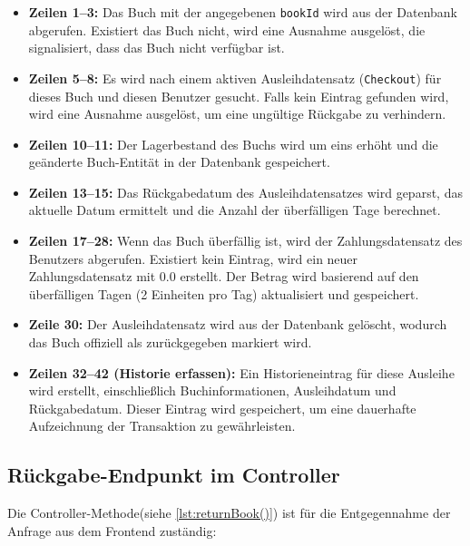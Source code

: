 \begin{itemize}
	\item \textbf{Zeilen 1--3:}  
	Das Buch mit der angegebenen \texttt{bookId} wird aus der Datenbank abgerufen. Existiert das Buch nicht, wird eine Ausnahme ausgelöst, die signalisiert, dass das Buch nicht verfügbar ist.
	
	\item \textbf{Zeilen 5--8:}  
	Es wird nach einem aktiven Ausleihdatensatz (\texttt{Checkout}) für dieses Buch und diesen Benutzer gesucht. Falls kein Eintrag gefunden wird, wird eine Ausnahme ausgelöst, um eine ungültige Rückgabe zu verhindern.
	
	\item \textbf{Zeilen 10--11:}  
	Der Lagerbestand des Buchs wird um eins erhöht und die geänderte Buch-Entität in der Datenbank gespeichert.
	
	\item \textbf{Zeilen 13--15:}  
	Das Rückgabedatum des Ausleihdatensatzes wird geparst, das aktuelle Datum ermittelt und die Anzahl der überfälligen Tage berechnet.
	
	\item \textbf{Zeilen 17--28:}  
	Wenn das Buch überfällig ist, wird der Zahlungsdatensatz des Benutzers abgerufen. Existiert kein Eintrag, wird ein neuer Zahlungsdatensatz mit 0.0 erstellt. Der Betrag wird basierend auf den überfälligen Tagen (2 Einheiten pro Tag) aktualisiert und gespeichert.
	
	\item \textbf{Zeile 30:}  
	Der Ausleihdatensatz wird aus der Datenbank gelöscht, wodurch das Buch offiziell als zurückgegeben markiert wird.
	
	\item \textbf{Zeilen 32--42 (Historie erfassen):}  
	Ein Historieneintrag für diese Ausleihe wird erstellt, einschließlich Buchinformationen, Ausleihdatum und Rückgabedatum. Dieser Eintrag wird gespeichert, um eine dauerhafte Aufzeichnung der Transaktion zu gewährleisten.
\end{itemize}



\subsection*{Rückgabe-Endpunkt im Controller}

Die Controller-Methode(siehe  \ref{lst:returnBook()}) ist für die Entgegennahme der Anfrage aus dem Frontend zuständig:


